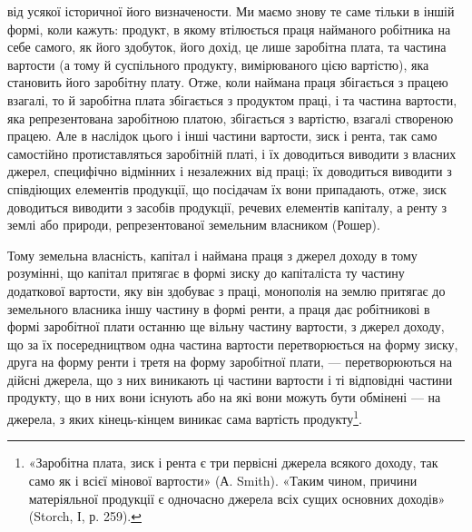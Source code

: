 \parcont{}  %
від усякої історичної його визначености. Ми маємо знову те саме тільки в іншій
формі, коли кажуть: продукт, в якому втілюється праця найманого робітника
на себе самого, як його здобуток, його дохід, це лише заробітна плата, та частина
вартости (а тому й суспільного продукту, вимірюваного цією вартістю),
яка становить його заробітну плату. Отже, коли наймана праця збігається з
працею взагалі, то й заробітна плата збігається з продуктом праці, і та частина
вартости, яка репрезентована заробітною платою, збігається з вартістю, взагалі
створеною працею. Але в наслідок цього і інші частини вартости, зиск і рента,
так само самостійно протиставляться заробітній платі, і їх доводиться виводити
з власних джерел, специфічно відмінних і незалежних від праці; їх доводиться
виводити з співдіющих елементів продукції, що посідачам їх вони припадають,
отже, зиск доводиться виводити з засобів продукції, речевих елементів капіталу,
а ренту з землі або природи, репрезентованої земельним власником (Рошер).

Тому земельна власність, капітал і наймана праця з джерел доходу в тому
розумінні, що капітал притягає в формі зиску до капіталіста ту частину додаткової
вартости, яку він здобуває з праці, монополія на землю притягає до
земельного власника іншу частину в формі ренти, а праця дає робітникові в
формі заробітної плати останню ще вільну частину вартости, з джерел доходу,
що за їх посередництвом одна частина вартости перетворюється на форму зиску,
друга на форму ренти і третя на форму заробітної плати, — перетворюються на
дійсні джерела, що з них виникають ці частини вартости і ті відповідні частини
продукту, що в них вони існують або на які вони можуть бути обмінені —
на джерела, з яких кінець-кінцем виникає сама вартість продукту\footnote{
«Заробітна плата, зиск і рента є три первісні джерела всякого доходу, так само як і всієї
мінової вартости» (А. Smith). «Таким чином, причини матеріяльної продукції є одночасно джерела всіх
сущих основних доходів» (Storch, І, р. 259).
}.

